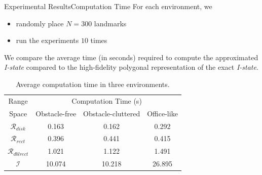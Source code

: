 \documentclass[10pt]{beamer}
\begin{document}
\begin{frame}{Experimental Results}{Computation Time}
  For each environment, we
  \begin{itemize}
  \item randomly place $N = 300$ landmarks 
  \item run the  experiments $10$ times
  \end{itemize} 
  \begin{block}{}
    \small{We compare the average time (in seconds) required to compute the
      approximated \emph{I-state} compared to the high-fidelity polygonal
      representation of the exact \emph{I-state}.}
  \end{block}
\begin{table}
  \footnotesize\centering
    \begin{tabular}{cccc} 
    \hline
    Range & \multicolumn{3}{c}{Computation Time (s)}  \\
    Space & Obstacle-free & Obstacle-cluttered & Office-like\\
    \hline
    $\mathcal{R}_{disk}$ & 0.163  & 0.162   & 0.292  \\ 
    \hline
    $\mathcal{R}_{rect}$ & 0.396   & 0.441  & 0.415  \\
    \hline
    $\mathcal{R}_{dblrect}$ & 1.021  & 1.122  & 1.491  \\
    \hline
    $\mathcal{I}$ & 10.074  & 10.218  & 26.895  \\
    \hline
    \end{tabular}
    \caption{\scriptsize{Average computation time in three environments.}}
\end{table}
\end{frame}
\end{document}
